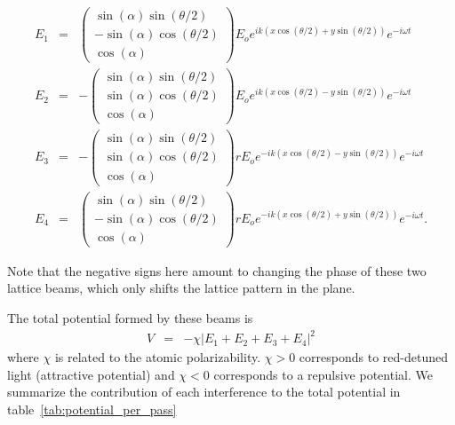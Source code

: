 \documentclass{article}
\theoremstyle{definition}
\begin{document}
\begin{eqnarray}
  E_1 &=& 
  \begin{pmatrix}
  \sin(\alpha) \sin(\theta/2)\\
  -\sin(\alpha) \cos(\theta/2)\\
  \cos(\alpha)
  \end{pmatrix}
  E_o e^{ik(x\cos(\theta/2) + y\sin(\theta/2))} e^{-i \omega t} \\
  E_2 &=&
   -\begin{pmatrix}
  \sin(\alpha) \sin(\theta/2)\\
  \sin(\alpha) \cos(\theta/2)\\
  \cos(\alpha)
  \end{pmatrix} 
  E_o e^{ik(x\cos(\theta/2) - y\sin(\theta/2))} e^{-i \omega t}\\
  E_3 &=& -
   \begin{pmatrix}
  \sin(\alpha) \sin(\theta/2)\\
  \sin(\alpha) \cos(\theta/2)\\
  \cos(\alpha)
  \end{pmatrix} 
  r E_o e^{-ik(x\cos(\theta/2) - y\sin(\theta/2))} e^{-i \omega t} \\
  E_4 &=&  
  \begin{pmatrix}
  \sin(\alpha) \sin(\theta/2)\\
  -\sin(\alpha) \cos(\theta/2)\\
  \cos(\alpha)
  \end{pmatrix}
  r E_o e^{-ik(x\cos(\theta/2) + y\sin(\theta/2))} e^{-i \omega t}. 
\end{eqnarray}

Note that the negative signs here amount to changing the phase of these two lattice beams, which only shifts the lattice pattern in the plane.

The total potential formed by these beams is
\begin{eqnarray}
  V &=& -\chi \left|E_1 + E_2 + E_3 + E_4 \right|^2
\end{eqnarray}
where $\chi$ is related to the atomic polarizability. $\chi>0$ corresponds to red-detuned light (attractive potential) and $\chi<0$ corresponds to a repulsive potential. We summarize the contribution of each interference to the total potential in table~\ref{tab:potential_per_pass}
\end{document}

